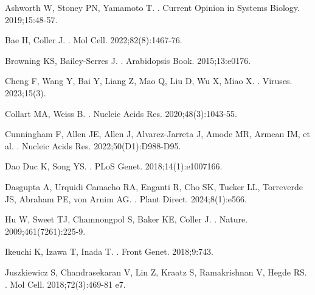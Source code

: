\documentclass[10pt,letterpaper]{article}
\begin{document}
\begin{thebibliography}{10}

Ashworth W, Stoney PN, Yamamoto T.
.
\newblock Current Opinion in Systems Biology. 2019;15:48-57.

Bae H, Coller J.
.
\newblock Mol Cell. 2022;82(8):1467-76.

Browning KS, Bailey-Serres J.
.
\newblock Arabidopsis Book. 2015;13:e0176. 

Cheng F, Wang Y, Bai Y, Liang Z, Mao Q, Liu D, Wu X, Miao X.
.
\newblock Viruses. 2023;15(3).

Collart MA, Weiss B.
.
\newblock Nucleic Acids Res. 2020;48(3):1043-55.

Cunningham F, Allen JE, Allen J, Alvarez-Jarreta J, Amode MR, Armean IM, et al.
.
\newblock Nucleic Acids Res. 2022;50(D1):D988-D95.

Dao Duc K, Song YS. 
.
\newblock PLoS Genet. 2018;14(1):e1007166.

Dasgupta A, Urquidi Camacho RA, Enganti R, Cho SK, Tucker LL, Torreverde JS, Abraham PE, von Arnim AG.
.
\newblock  Plant Direct. 2024;8(1):e566.

Hu W, Sweet TJ, Chamnongpol S, Baker KE, Coller J.
.
\newblock Nature. 2009;461(7261):225-9.

Ikeuchi K, Izawa T, Inada T.
.
\newblock Front Genet. 2018;9:743.

Juszkiewicz S, Chandrasekaran V, Lin Z, Kraatz S, Ramakrishnan V, Hegde RS.
.
\newblock Mol Cell. 2018;72(3):469-81 e7.


\end{thebibliography}
\end{document}

